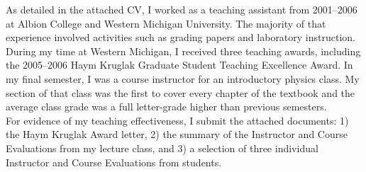 As detailed in the attached CV, I worked as a teaching assistant from 2001--2006 at Albion College and Western Michigan University.  The majority of that experience involved activities such as grading papers and laboratory instruction.  During my time at Western Michigan, I received three teaching awards, including the 2005--2006 Haym Kruglak Graduate Student Teaching Excellence Award.  In my final semester, I was a course instructor for an introductory physics class.  My section of that class was the first to cover every chapter of the textbook and the average class grade was a full letter-grade higher than previous semesters.\\

For evidence of my teaching effectiveness, I submit the attached documents: 1) the Haym Kruglak Award letter, 2) the summary of the Instructor and Course Evaluations from my lecture class, and 3) a selection of three individual Instructor and Course Evaluations from students.